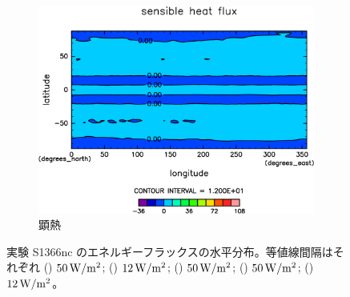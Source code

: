 \documentclass[body]{subfiles}
\begin{document}
\begin{figure}[t]
\begin{subfigure}{.4\textwidth}
		\includegraphics[width=\textwidth]{S1366-nc/Sens,time=3650:4015-crop-rotate.pdf}
		\caption{顕熱\hmu*{[W/m^{-2}]}}\label{S1366nc顕熱}
	\end{subfigure}
	\caption[実験 S1366nc のエネルギーフラックスの水平分布]{
		実験 S1366nc のエネルギーフラックスの水平分布。等値線間隔はそれぞれ
		() \(50\hmu{W/m^2}\);
		() \(12\hmu{W/m^2}\);
		() \(50\hmu{W/m^2}\);
		() \(50\hmu{W/m^2}\);
		() \(12\hmu{W/m^2}\)。
	}\label{S1366nc_heat}
\end{figure}
\end{document}
